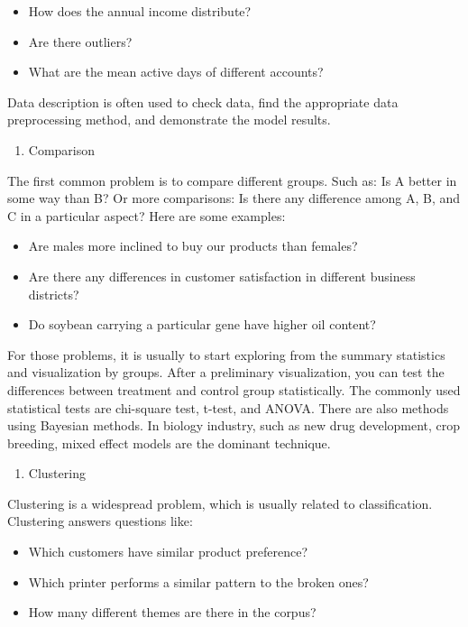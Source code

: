 \documentclass[12pt,]{krantz}
\providecommand{\tightlist}{%
  \setlength{\itemsep}{0pt}\setlength{\parskip}{0pt}}
\begin{document}
\begin{itemize}
\tightlist
\item
  How does the annual income distribute?
\item
  Are there outliers?
\item
  What are the mean active days of different accounts?
\end{itemize}

Data description is often used to check data, find the appropriate data preprocessing method, and demonstrate the model results.

\begin{enumerate}
\def\labelenumi{\arabic{enumi}.}
\setcounter{enumi}{1}
\tightlist
\item
  Comparison
\end{enumerate}

The first common problem is to compare different groups. Such as: Is A better in some way than B? Or more comparisons: Is there any difference among A, B, and C in a particular aspect? Here are some examples:

\begin{itemize}
\tightlist
\item
  Are males more inclined to buy our products than females?
\item
  Are there any differences in customer satisfaction in different business districts?
\item
  Do soybean carrying a particular gene have higher oil content?
\end{itemize}

For those problems, it is usually to start exploring from the summary statistics and visualization by groups. After a preliminary visualization, you can test the differences between treatment and control group statistically. The commonly used statistical tests are chi-square test, t-test, and ANOVA. There are also methods using Bayesian methods. In biology industry, such as new drug development, crop breeding, mixed effect models are the dominant technique.

\begin{enumerate}
\def\labelenumi{\arabic{enumi}.}
\setcounter{enumi}{2}
\tightlist
\item
  Clustering
\end{enumerate}

Clustering is a widespread problem, which is usually related to classification. Clustering answers questions like:

\begin{itemize}
\tightlist
\item
  Which customers have similar product preference?
\item
  Which printer performs a similar pattern to the broken ones?
\item
  How many different themes are there in the corpus?
\end{itemize}
\end{document}
